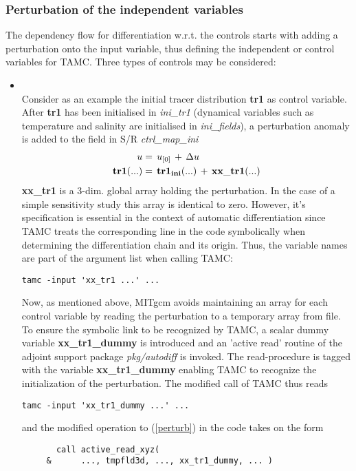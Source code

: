 \subsubsection{Perturbation of the independent variables}
%
The dependency flow for differentiation w.r.t. the controls 
starts with adding a perturbation onto the input variable,
thus defining the independent or control variables for TAMC.
Three types of controls may be considered:
%
\begin{itemize}
%
\item 
{}
\\
%
Consider as an example the initial tracer distribution
{\bf tr1} as control variable.
After {\bf tr1} has been initialised in
{\it ini\_tr1} (dynamical variables such as
temperature and salinity are initialised in {\it ini\_fields}),
a perturbation anomaly is added to the field in S/R
{\it ctrl\_map\_ini}
%
\begin{equation}
\begin{split}
u         & = \, u_{[0]} \, + \, \Delta u \\
{\bf tr1}(...) & = \, {\bf tr1_{ini}}(...) \, + \, {\bf xx\_tr1}(...)
\label{perturb}
\end{split}
\end{equation}
%
{\bf xx\_tr1} is a 3-dim. global array 
holding the perturbation. In the case of a simple
sensitivity study this array is identical to zero.
However, it's specification is essential in the context
of automatic differentiation since TAMC
treats the corresponding line in the code symbolically
when determining the differentiation chain and its origin.
Thus, the variable names are part of the argument list
when calling TAMC: 
%
\begin{verbatim}
tamc -input 'xx_tr1 ...' ...
\end{verbatim}
%
Now, as mentioned above, MITgcm avoids maintaining
an array for each control variable by reading the
perturbation to a temporary array from file.
To ensure the symbolic link to be recognized by TAMC, a scalar
dummy variable {\bf xx\_tr1\_dummy} is introduced
and an 'active read' routine of the adjoint support
package {\it pkg/autodiff} is invoked.
The read-procedure is tagged with the variable
{\bf xx\_tr1\_dummy} enabling TAMC to recognize the
initialization of the perturbation.
The modified call of TAMC thus reads
%
\begin{verbatim}
tamc -input 'xx_tr1_dummy ...' ...
\end{verbatim}
%
and the modified operation to (\ref{perturb})
in the code takes on the form
%
\begin{verbatim}
       call active_read_xyz( 
     &      ..., tmpfld3d, ..., xx_tr1_dummy, ... )


\end{verbatim}
\end{itemize}
